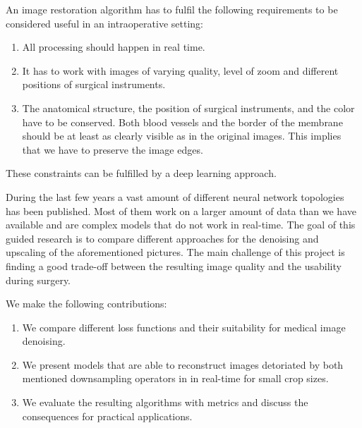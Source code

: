 \documentclass{scrartcl}
\begin{document}
An image restoration algorithm has to fulfil the following requirements to be considered useful in an intraoperative setting:
\begin{enumerate}
\item All processing should happen in real time.
\item It has to work with images of varying quality, level of zoom and different positions of surgical instruments.
\item The anatomical structure, the position of surgical instruments, and the color have to be conserved.
Both blood vessels and the border of the membrane should be at least as clearly visible as in the original images.
This implies that we have to preserve the image edges.
\end{enumerate}
These constraints can be fulfilled by a deep learning approach.

During the last few years a vast amount of different neural network topologies has been published.
Most of them work on a larger amount of data than we have available and are complex models that do not work in real-time.
The goal of this guided research is to compare different approaches for the denoising and upscaling of the aforementioned pictures.
The main challenge of this project is finding a good trade-off between the resulting image quality and the usability during surgery.

We make the following contributions:
\begin{enumerate}
\item We compare different loss functions and their suitability for medical image denoising.
\item We present models that are able to reconstruct images detoriated by both mentioned downsampling operators in in real-time for small crop sizes.
\item We evaluate the resulting algorithms with metrics and discuss the consequences for practical applications.
\end{enumerate}
\end{document}

